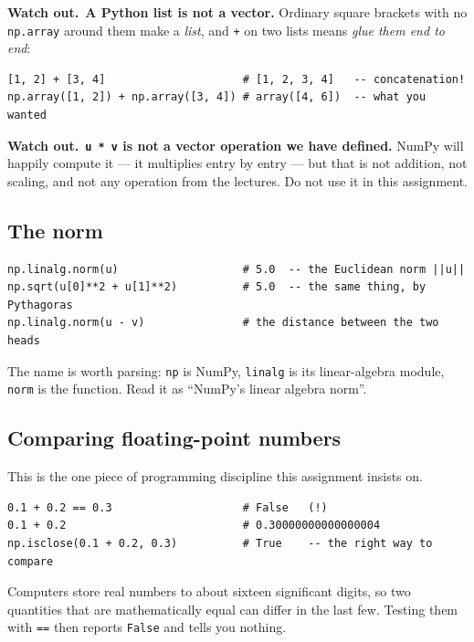 \documentclass[11pt]{article}
\theoremstyle{definition}
\newcommand{\heads}[1]{\par\smallskip\noindent
  {\small\sffamily\textcolor{BrickRed}{\textbf{Watch out.}}\ #1}\par\smallskip}
\begin{document}
\heads{\textbf{A Python list is not a vector.} Ordinary square brackets with no
\texttt{np.array} around them make a \emph{list}, and \texttt{+} on two lists
means \emph{glue them end to end}:}

\begin{lstlisting}
[1, 2] + [3, 4]                     # [1, 2, 3, 4]   -- concatenation!
np.array([1, 2]) + np.array([3, 4]) # array([4, 6])  -- what you wanted
\end{lstlisting}


\heads{\textbf{\texttt{u * v} is not a vector operation we have defined.} NumPy
will happily compute it --- it multiplies entry by entry --- but that is not
addition, not scaling, and not any operation from the lectures. Do not use it in
this assignment.}

\subsection{The norm}

\begin{lstlisting}
np.linalg.norm(u)                   # 5.0  -- the Euclidean norm ||u||
np.sqrt(u[0]**2 + u[1]**2)          # 5.0  -- the same thing, by Pythagoras
np.linalg.norm(u - v)               # the distance between the two heads
\end{lstlisting}

\noindent The name is worth parsing: \texttt{np} is NumPy, \texttt{linalg} is
its linear-algebra module, \texttt{norm} is the function. Read it as ``NumPy's
linear algebra norm''.

\subsection{Comparing floating-point numbers}

This is the one piece of programming discipline this assignment insists on.

\begin{lstlisting}
0.1 + 0.2 == 0.3                    # False   (!)
0.1 + 0.2                           # 0.30000000000000004
np.isclose(0.1 + 0.2, 0.3)          # True    -- the right way to compare
\end{lstlisting}

\noindent Computers store real numbers to about sixteen significant digits, so
two quantities that are mathematically equal can differ in the last few. Testing
them with \texttt{==} then reports \texttt{False} and tells you nothing.
\end{document}
